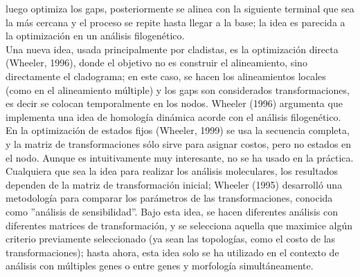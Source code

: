 luego optimiza los gaps, posteriormente se alinea con la siguiente terminal que sea la m\'as cercana y el proceso se repite 
hasta llegar a la base; la idea es parecida a la optimizaci\'on en un an\'alisis filogen\'etico.\\
Una nueva idea, usada principalmente por cladistas, es la optimizaci\'on directa (Wheeler, 1996), donde el 
objetivo no es construir el alineamiento, sino directamente el cladograma; en este caso, se hacen los alineamientos locales 
(como en el alineamiento m\'ultiple) y los gaps son considerados transformaciones, es decir se colocan temporalmente en 
los nodos. Wheeler (1996) argumenta que implementa una idea de homolog\'ia din\'amica acorde con el an\'alisis filogen\'etico. 
En la optimizaci\'on de estados fijos (Wheeler, 1999) se usa la secuencia completa, y la matriz de transformaciones s\'olo 
sirve para asignar costos, pero no estados en el nodo.  Aunque es intuitivamente muy 
interesante, no se ha usado en la pr\'actica. Cualquiera que sea la idea para realizar los an\'alisis moleculares, los 
resultados dependen de la matriz de transformaci\'on inicial; Wheeler (1995) desarroll\'o una metodolog\'ia para comparar 
los par\'ametros de las transformaciones, conocida como ''an\'alisis de sensibilidad''.
Bajo esta idea, se hacen diferentes an\'alisis con diferentes matrices de transformaci\'on, y se selecciona aquella que 
maximice alg\'un criterio previamente seleccionado (ya sean las topolog\'ias, como el costo de las transformaciones); hasta 
ahora, esta idea solo se ha utilizado en el contexto de an\'alisis con m\'ultiples genes o entre genes y morfolog\'ia 
simult\'aneamente.
